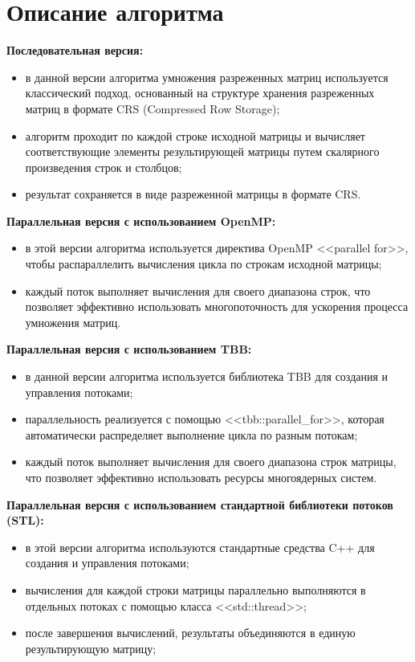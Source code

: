 \documentclass[a4paper, 14pt]{article}
\theoremstyle{plain}
\begin{document}
\newpage
\section*{\centering Описание алгоритма}
\textbf{Последовательная версия:}
\vspace{-1em}
\begin{itemize}[leftmargin=3em]
	\setlength\itemsep{0cm}
	\item в данной версии алгоритма умножения разреженных матриц используется классический подход, основанный на структуре хранения разреженных матриц в формате CRS (Compressed Row Storage);
	\item алгоритм проходит по каждой строке исходной матрицы и вычисляет соответствующие элементы результирующей матрицы путем скалярного произведения строк и столбцов;
	\item результат сохраняется в виде разреженной матрицы в формате CRS.
\end{itemize}

\textbf{Параллельная версия с использованием OpenMP:}
\vspace{-1em}
\begin{itemize}[leftmargin=3em]
	\setlength\itemsep{0cm}
	\item в этой версии алгоритма используется директива OpenMP <<parallel for>>, чтобы распараллелить вычисления цикла по строкам исходной матрицы;
	\item каждый поток выполняет вычисления для своего диапазона строк, что позволяет эффективно использовать многопоточность для ускорения процесса умножения матриц.
\end{itemize}

\textbf{Параллельная версия с использованием TBB:}
\vspace{-1em}
\begin{itemize}[leftmargin=3em]
	\setlength\itemsep{0cm}
	\item в данной версии алгоритма используется библиотека TBB для создания и управления потоками;
	\item параллельность реализуется с помощью <<tbb::parallel\_for>>, которая автоматически распределяет выполнение цикла по разным потокам;
	\item каждый поток выполняет вычисления для своего диапазона строк матрицы, что позволяет эффективно использовать ресурсы многоядерных систем.
\end{itemize}

\textbf{Параллельная версия с использованием стандартной библиотеки потоков (STL):}
\vspace{-1em}
\begin{itemize}[leftmargin=3em]
	\setlength\itemsep{0cm}
	\item в этой версии алгоритма используются стандартные средства C++ для создания и управления потоками;
	\item вычисления для каждой строки матрицы параллельно выполняются в отдельных потоках с помощью класса <<std::thread>>;
	\item после завершения вычислений, результаты объединяются в единую результирующую матрицу;
\end{itemize}
\end{document}
